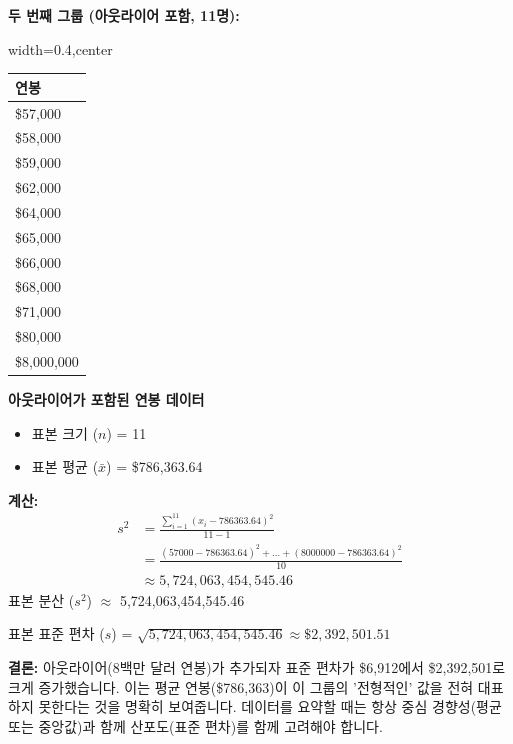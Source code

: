 \documentclass[11pt,a4paper]{book}
\providecommand{\captionof}[2]{\textbf{#2}}
\theoremstyle{definition}
\begin{document}
\begin{examplebox}[title=예시: 연봉 데이터로 분산 및 표준 편차 계산]
\textbf{두 번째 그룹 (아웃라이어 포함, 11명):}
\begin{adjustbox}{width=0.4\textwidth,center}
\begin{tabular}{l}
\toprule
\textbf{연봉} \\
\midrule
\$57,000 \\
\$58,000 \\
\$59,000 \\
\$62,000 \\
\$64,000 \\
\$65,000 \\
\$66,000 \\
\$68,000 \\
\$71,000 \\
\$80,000 \\
\$8,000,000 \\
\bottomrule
\end{tabular}
\end{adjustbox}
\captionof{table}{아웃라이어가 포함된 연봉 데이터}
\label{tab:salary_example2_sd}
\begin{itemize}
    \item 표본 크기 ($n$) = 11
    \item 표본 평균 ($\bar{x}$) = \$786,363.64
\end{itemize}
\textbf{계산:}
\begin{align*}
    s^2 &= \frac{\sum_{i=1}^{11} (x_i - 786363.64)^2}{11-1} \\
    &= \frac{(57000-786363.64)^2 + \dots + (8000000-786363.64)^2}{10} \\
    &\approx 5,724,063,454,545.46
\end{align*}
표본 분산 ($s^2$) $\approx$ 5,724,063,454,545.46

표본 표준 편차 ($s$) = $\sqrt{5,724,063,454,545.46} \approx \$2,392,501.51$

\textbf{결론:}
아웃라이어(8백만 달러 연봉)가 추가되자 표준 편차가 \$6,912에서 \$2,392,501로 크게 증가했습니다.
이는 평균 연봉(\$786,363)이 이 그룹의 '전형적인' 값을 전혀 대표하지 못한다는 것을 명확히 보여줍니다.
데이터를 요약할 때는 항상 중심 경향성(평균 또는 중앙값)과 함께 산포도(표준 편차)를 함께 고려해야 합니다.
\end{examplebox}
\end{document}
